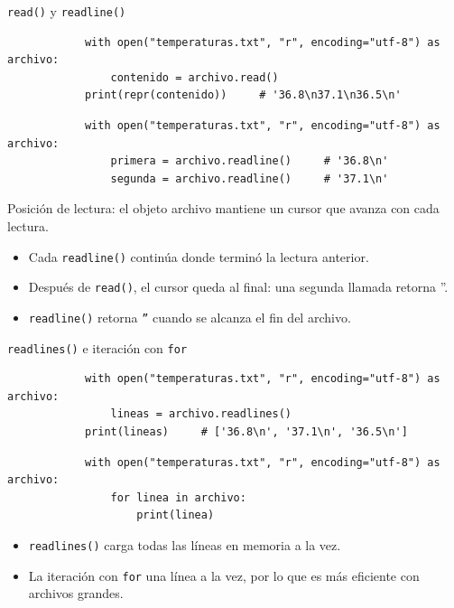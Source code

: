 \documentclass{beamer}
\begin{document}
    \begin{frame}[fragile, t]{\texttt{read()} y \texttt{readline()}}
        \begin{verbatim}
            with open("temperaturas.txt", "r", encoding="utf-8") as archivo:
                contenido = archivo.read()
            print(repr(contenido))     # '36.8\n37.1\n36.5\n'
        \end{verbatim}

        \begin{verbatim}
            with open("temperaturas.txt", "r", encoding="utf-8") as archivo:
                primera = archivo.readline()     # '36.8\n'
                segunda = archivo.readline()     # '37.1\n'
        \end{verbatim}

        Posición de lectura: el objeto archivo mantiene un cursor que avanza con cada lectura.

        \begin{itemize}
            \item Cada \texttt{readline()} continúa donde terminó la lectura anterior.
            \item Después de \texttt{read()}, el cursor queda al final: una segunda llamada retorna ''.
            \item \texttt{readline()} retorna \texttt{''} cuando se alcanza el fin del archivo.
        \end{itemize}
    \end{frame}

    \begin{frame}[fragile, t]{\texttt{readlines()} e iteración con \texttt{for}}
        \begin{verbatim}
            with open("temperaturas.txt", "r", encoding="utf-8") as archivo:
                lineas = archivo.readlines()
            print(lineas)     # ['36.8\n', '37.1\n', '36.5\n']
        \end{verbatim}

        \begin{verbatim}
            with open("temperaturas.txt", "r", encoding="utf-8") as archivo:
                for linea in archivo:
                    print(linea)    
        \end{verbatim}

        \begin{itemize}
            \item \texttt{readlines()} carga todas las líneas en memoria a la vez.
            \item La iteración con \texttt{for} una línea a la vez, por lo que es más eficiente con archivos grandes.
        \end{itemize}
    \end{frame}
\end{document}
